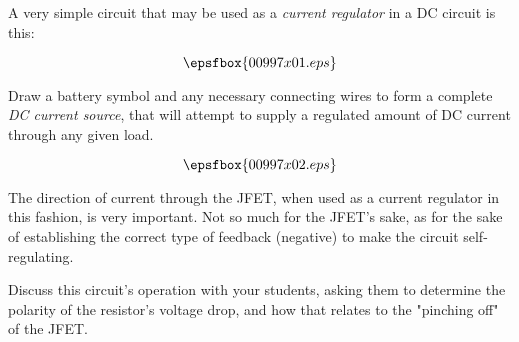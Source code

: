 

A very simple circuit that may be used as a {\it current regulator} in a DC circuit is this:

\vskip 10pt

$$\epsfbox{00997x01.eps}$$

\vskip 10pt

Draw a battery symbol and any necessary connecting wires to form a complete {\it DC current source}, that will attempt to supply a regulated amount of DC current through any given load.







$$\epsfbox{00997x02.eps}$$







The direction of current through the JFET, when used as a current regulator in this fashion, is very important.  Not so much for the JFET's sake, as for the sake of establishing the correct type of feedback (negative) to make the circuit self-regulating.

Discuss this circuit's operation with your students, asking them to determine the polarity of the resistor's voltage drop, and how that relates to the "pinching off" of the JFET.




